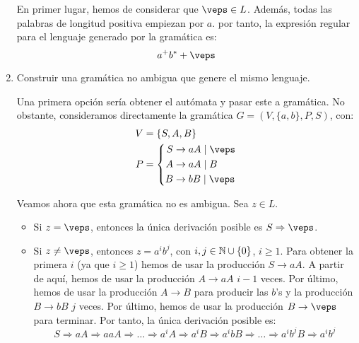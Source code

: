 \begin{ejercicio}
\begin{enumerate}
        En primer lugar, hemos de considerar que $\veps\in L$. Además, todas las palabras de longitud positiva empiezan por $a$. por tanto, la expresión regular para el lenguaje generado por la gramática es:
        \begin{equation*}
            a^+b^*+\veps
        \end{equation*}
        \item Construir una gramática no ambigua que genere el mismo lenguaje.
        
        Una primera opción sería obtener el autómata y pasar este a gramática. No obstante, consideramos directamente la gramática $G=(V,\{a,b\},P,S)$, con:
        \begin{equation*}
            \begin{aligned}
                V &= \{ S, A, B \} \\
                P &= \left\{
                    \begin{aligned}
                        S &\rightarrow aA \mid \veps\\
                        A &\rightarrow aA \mid B\\
                        B &\rightarrow bB \mid \veps
                    \end{aligned}
                \right.
            \end{aligned}
        \end{equation*}

        Veamos ahora que esta gramática no es ambigua. Sea $z\in L$.
        \begin{itemize}
            \item Si $z=\veps$, entonces la única derivación posible es $S\Rightarrow \veps$.
            \item Si $z\neq \veps$, entonces $z=a^ib^j$, con $i,j\in \mathbb{N}\cup \{0\}$, $i\geq 1$.
            Para obtener la primera $i$ (ya que $i\geq 1$) hemos de usar la producción $S\rightarrow aA$. A partir de aquí, hemos de usar la producción $A\rightarrow aA$ $i-1$ veces. Por último, hemos de usar la producción $A\rightarrow B$ para producir las $b$'s y la producción $B\rightarrow bB$ $j$ veces. Por último, hemos de usar la producción $B\rightarrow \veps$ para terminar. Por tanto, la única derivación posible es:
            \begin{equation*}
                S\Rightarrow aA\Rightarrow aaA\Rightarrow \ldots \Rightarrow a^{i}A\Rightarrow a^{i}B\Rightarrow a^{i}bB\Rightarrow \ldots \Rightarrow a^{i}b^jB\Rightarrow a^{i}b^j
            \end{equation*}
        \end{itemize}
    \end{enumerate}
\end{ejercicio}

